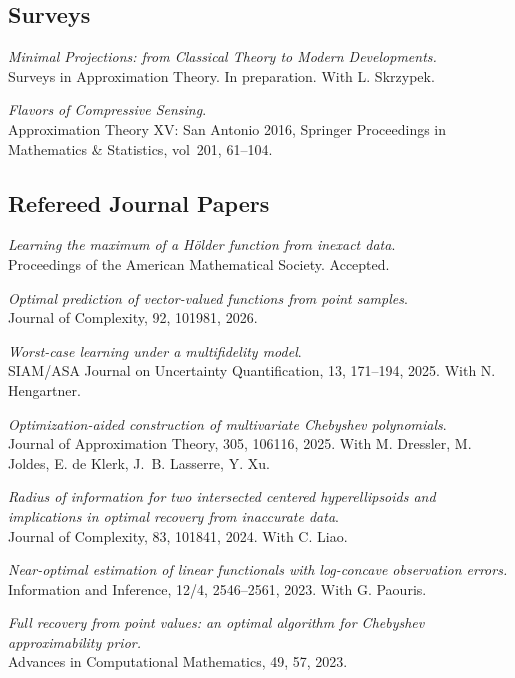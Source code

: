 \documentclass[11pt]{article}
\begin{document}
\subsection{Surveys}
\betaremune
\item {\sl Minimal Projections:
from Classical Theory to Modern Developments.}\\
Surveys in Approximation Theory. In preparation. With L. Skrzypek.
\item {\sl Flavors of Compressive Sensing}.\\
Approximation Theory XV: San Antonio 2016,
Springer Proceedings in Mathematics \& Statistics,
vol~201, 61--104. 
\eetaremune

\subsection{Refereed Journal Papers}
\betaremune
\item {\sl Learning the maximum of a H\"older function from inexact data}.\\
Proceedings of the American Mathematical Society. Accepted.
\item {\sl Optimal prediction of vector-valued functions from point samples}.\\
Journal of Complexity, 92, 101981, 2026. 
\item {\sl Worst-case learning under a multifidelity model}.\\
SIAM/ASA Journal on Uncertainty Quantification, 13, 171--194, 2025. With N. Hengartner.
\item {\sl Optimization-aided construction of multivariate Chebyshev polynomials}.\\
Journal of Approximation Theory, 305, 106116, 2025. With M.  Dressler, M.  Joldes, E. de Klerk, J.~B. Lasserre,  Y. Xu.
\item {\sl Radius of information for two intersected centered hyperellipsoids and implications in optimal recovery from inaccurate data}. \\
Journal of Complexity, 83, 101841, 2024. With C. Liao.
\item {\sl Near-optimal estimation of linear functionals with log-concave observation errors.}\\
Information and Inference, 12/4, 2546--2561, 2023.  
With G. Paouris.
\item {\sl Full recovery from point values: an optimal algorithm for Chebyshev approximability prior.}\\
Advances in Computational Mathematics,  49, 57, 2023.	
\end{document}
